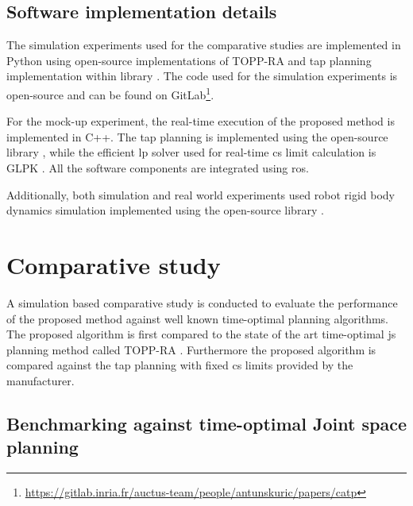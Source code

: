 \subsection{Software implementation details}
The simulation experiments used for the comparative studies are implemented in Python
using open-source implementations of TOPP-RA \cite{Pham2018} and \gls{tap} planning implementation within  library \cite{ruckig}. The code used for the simulation experiments is open-source and can be found on GitLab\footnote{\url{https://gitlab.inria.fr/auctus-team/people/antunskuric/papers/catp}}.

For the mock-up experiment, the real-time execution of the proposed method is implemented in C++. The \gls{tap} planning is implemented using the open-source library  \cite{ruckig}, while the efficient \gls{lp} solver used for real-time \gls{cs} limit calculation is GLPK \cite{glpk}. All the software components are integrated using \gls{ros}.

Additionally, both simulation and real world experiments used robot rigid body dynamics simulation implemented using the open-source library  \cite{pinocchio2021}. 



\section{Comparative study}
\label{ch:comp_study}
A simulation based comparative study is conducted to evaluate the performance of the proposed method against well known time-optimal planning algorithms. The proposed algorithm is first compared to the state of the art time-optimal \gls{js} planning method called TOPP-RA \cite{Pham2018}. Furthermore the proposed algorithm is compared against the \gls{tap} planning with fixed \gls{cs} limits provided by the manufacturer.

\subsection{Benchmarking against time-optimal Joint space planning}

